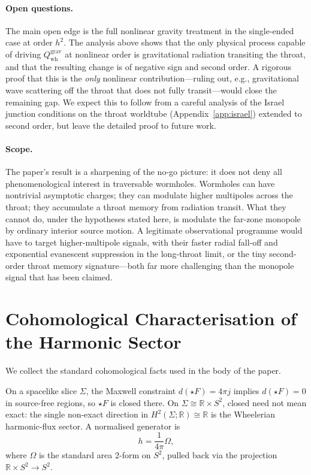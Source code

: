 \documentclass[aps,prd,onecolumn,nofootinbib,superscriptaddress]{revtex4-2}
\begin{document}
\paragraph{Open questions.}
The main open edge is the full nonlinear gravity treatment in the single-ended
case at order $h^2$.  The analysis above shows that the only physical process
capable of driving $Q_{\mathrm{wh}}^{\mathrm{grav}}$ at nonlinear order is
gravitational radiation transiting the throat, and that the resulting change is
of negative sign and second order.  A rigorous proof that this is the \emph{only}
nonlinear contribution---ruling out, e.g., gravitational wave scattering off
the throat that does not fully transit---would close the remaining gap.  We
expect this to follow from a careful analysis of the Israel junction conditions
on the throat worldtube (Appendix~\ref{app:israel}) extended to second order,
but leave the detailed proof to future work.

\paragraph{Scope.}
The paper's result is a sharpening of the no-go picture: it does not deny all
phenomenological interest in traversable wormholes.  Wormholes can have
nontrivial asymptotic charges; they can modulate higher multipoles across the
throat; they accumulate a throat memory from radiation transit.  What they
cannot do, under the hypotheses stated here, is modulate the far-zone monopole
by ordinary interior source motion.  A legitimate observational programme would
have to target higher-multipole signals, with their faster radial fall-off and
exponential evanescent suppression in the long-throat limit, or the tiny
second-order throat memory signature---both far more challenging than the
monopole signal that has been claimed.

\appendix

\section{Cohomological Characterisation of the Harmonic Sector}
\label{app:cohomology}

We collect the standard cohomological facts used in the body of the paper.

On a spacelike slice $\Sigma$, the Maxwell constraint $d(\star F)=4\pi j$
implies $d(\star F)=0$ in source-free regions, so $\star F$ is closed there.
On $\Sigma\cong\mathbb{R}\times S^2$, closed need not mean exact: the single
non-exact direction in $H^2(\Sigma;\mathbb{R})\cong\mathbb{R}$ is the
Wheelerian harmonic-flux sector.  A normalised generator is
\begin{equation}
  h = \frac{1}{4\pi}\Omega,
\end{equation}
where $\Omega$ is the standard area 2-form on $S^2$, pulled back via the
projection $\mathbb{R}\times S^2\to S^2$.
\end{document}
